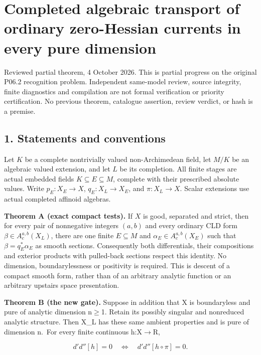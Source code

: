 \documentclass[
  10pt,
]{article}
\author{}
\date{}
\begin{document}
\section{Completed algebraic transport of ordinary zero-Hessian currents
in every pure
dimension}\label{completed-algebraic-transport-of-ordinary-zero-hessian-currents-in-every-pure-dimension}

Reviewed partial theorem, 4 October 2026. This is partial progress on
the original P06.2 recognition problem. Independent same-model review,
source integrity, finite diagnostics and compilation are not formal
verification or priority certification. No previous theorem, catalogue assertion, review verdict,
or hash is a premise.

\subsection{1. Statements and
conventions}\label{statements-and-conventions}

Let \(K\) be a complete nontrivially valued non-Archimedean field,
let \(M/K\) be an algebraic valued extension, and let \(L\) be its
completion. All finite stages are actual embedded fields
\(K\subseteq E\subseteq M\), complete with their prescribed absolute
values. Write \(p_E:X_E\to X\), \(q_E:X_L\to X_E\), and
\(\pi:X_L\to X\). Scalar extensions use actual completed affinoid algebras.

\textbf{Theorem A (exact compact tests).} If \(X\) is good, separated
and strict, then for every pair of nonnegative integers \((a,b)\) and
every ordinary CLD form \(\beta\in A_c^{a,b}(X_L)\), there are one
finite \(E\subseteq M\) and \(\alpha_E\in A_c^{a,b}(X_E)\) such that
\(\beta=q_E^*\alpha_E\) as smooth sections. Consequently both
differentials, their compositions and exterior products with pulled-back
sections respect this identity. No dimension, boundarylessness or
positivity is required. This is descent of a compact smooth form, rather
than of an arbitrary analytic function or an arbitrary upstairs space
presentation.

\textbf{Theorem B (the new gate).} Suppose in addition that X is
boundaryless and pure of analytic dimension n\ensuremath{\ge}1. Retain its possibly
singular and nonreduced analytic structure. Then X\_L has these same
ambient properties and is pure of dimension n.~For every finite
continuous h:X\ensuremath{\to}R,

\[
 d'd''[h]=0\quad\Longleftrightarrow\quad d'd''[h\circ\pi]=0.       \tag{T}
\]
\end{document}
